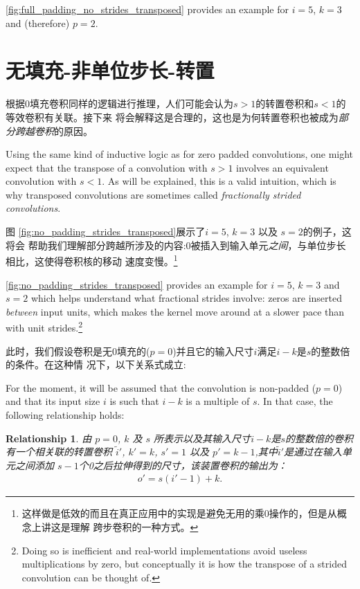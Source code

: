 \documentclass[notitlepage]{report}
\newtheorem{relationship}{Relationship}
\begin{document}
\autoref{fig:full_padding_no_strides_transposed} provides an example for $i =
5$, $k = 3$ and (therefore) $p = 2$.

\section{无填充-非单位步长-转置}

根据0填充卷积同样的逻辑进行推理，人们可能会认为$s > 1$的转置卷积和$s < 1$的等效卷积有关联。接下来
将会解释这是合理的，这也是为何转置卷积也被成为{\em 部分跨越卷积}的原因。

Using the same kind of inductive logic as for zero padded convolutions, one
might expect that the transpose of a convolution with $s > 1$ involves an
equivalent convolution with $s < 1$. As will be explained, this is a valid
intuition, which is why transposed convolutions are sometimes called {\em
fractionally strided convolutions}.

图 \autoref{fig:no_padding_strides_transposed}展示了$i = 5$, $k= 3$ 以及 $s = 2$的例子，这将会
帮助我们理解部分跨越所涉及的内容:0被插入到输入单元{\em 之间\/}，与单位步长相比，这使得卷积核的移动
速度变慢。\footnote{这样做是低效的而且在真正应用中的实现是避免无用的乘0操作的，但是从概念上讲这是理解
跨步卷积的一种方式。}

\autoref{fig:no_padding_strides_transposed} provides an example for $i = 5$, $k
= 3$ and $s = 2$ which helps understand what fractional strides involve: zeros
are inserted {\em between\/} input units, which makes the kernel move around at
a slower pace than with unit strides.\footnote{Doing so is inefficient and
    real-world implementations avoid useless multiplications by zero, but
    conceptually it is how the transpose of a strided convolution can be
    thought of.}

此时，我们假设卷积是无0填充的($p = 0$)并且它的输入尺寸$i$满足$i - k$是$s$的整数倍的条件。在这种情
况下，以下关系式成立:

For the moment, it will be assumed that the convolution is non-padded ($p = 0$)
and that its input size $i$ is such that $i - k$ is a multiple of $s$. In that
case, the following relationship holds:

\begin{relationship}\label{rel:no_padding_strides_transposed}
由 $p = 0$, $k$ 及 $s$ 所表示以及其输入尺寸$i - k$是$s$的整数倍的卷积有一个相关联的转置卷积
$\tilde{i}'$, $k' = k$, $s' = 1$ 以及 $p' = k - 1$,其中$\tilde{i}'$是通过在输入单元之间添加
$s - 1$个0之后拉伸得到的尺寸，该装置卷积的输出为：
\begin{equation*}
\begin{split}
    o' = s (i' - 1) + k.
\end{split}
\end{equation*}
\end{relationship}
\end{document}
